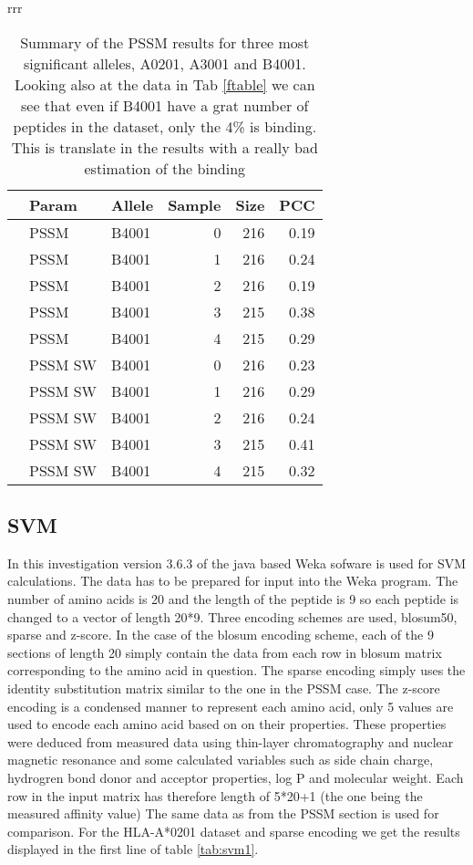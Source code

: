 \begin{table*}
\begin{center}
\begin{tabular}{rrr}
\begin{tabular}{rllrrr}
  \hline
 & Param & Allele & Sample & Size & PCC \\ 
  \hline
   & PSSM & B4001 &   0 & 216 & 0.19 \\ 
   & PSSM & B4001 &   1 & 216 & 0.24 \\ 
   & PSSM & B4001 &   2 & 216 & 0.19 \\ 
   & PSSM & B4001 &   3 & 215 & 0.38 \\ 
   & PSSM & B4001 &   4 & 215 & 0.29 \\ 
\hline
   & PSSM SW & B4001 &   0 & 216 & 0.23 \\ 
   & PSSM SW & B4001 &   1 & 216 & 0.29 \\ 
   & PSSM SW & B4001 &   2 & 216 & 0.24 \\ 
   & PSSM SW & B4001 &   3 & 215 & 0.41 \\ 
   & PSSM SW & B4001 &   4 & 215 & 0.32 \\ 
   \hline
\end{tabular}

\end{tabular}
\end{center}
\caption{Summary of the PSSM results for three most significant alleles, A0201, A3001 and B4001. Looking also at the data in Tab \ref{ftable} we can see that even if B4001 have a grat number of peptides in the dataset, only the 4\% is binding. This is translate in the results with a really bad estimation of the binding}\label{tab:pssm1}
\end{table*}

\subsection*{SVM}
In this investigation version 3.6.3 of the java based Weka sofware is used for SVM calculations.
The data has to be prepared for input into the Weka program.
The number of amino acids is 20 and the length of the peptide is 9 so each peptide is changed to a vector of length 20*9. 
Three encoding schemes are used, blosum50, sparse and z-score. 
In the case of the blosum encoding scheme, each of the 9 sections of length 20 simply contain the data from each row in blosum matrix corresponding to the amino acid in question.
The sparse encoding simply uses the identity substitution matrix similar to the one in the PSSM case. 
The z-score encoding is a condensed manner to represent each amino acid, only 5 values are used to encode each amino acid based on on their properties. 
These properties were deduced from measured data using thin-layer chromatography and nuclear magnetic resonance and some calculated variables 
such as side chain charge, hydrogren bond donor and acceptor properties, log P and molecular weight. 
Each row in the input matrix has therefore length of 5*20+1 (the one being the measured affinity value)
The same data as from the PSSM section is used for comparison. For the HLA-A*0201 dataset and sparse encoding we get the results displayed in the first line of table \ref{tab:svm1}.

